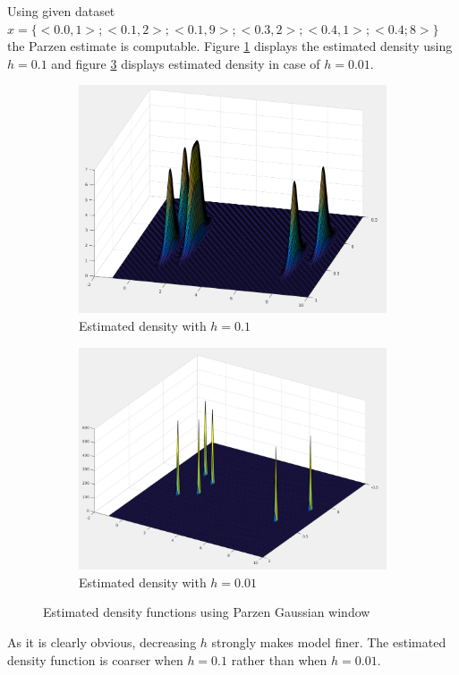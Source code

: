 \documentclass[12pt]{article}
\begin{document}
Using given dataset $x = \{<0.0, 1>; <0.1, 2>; <0.1, 9>; <0.3, 2>; <0.4, 1>; <0.4; 8>\}$ the Parzen estimate is computable. Figure \ref{fig:2-1} displays the estimated density using $h = 0.1$ and figure \ref{fig:2-2} displays estimated density in case of $h = 0.01$. 
\begin{figure}[h]
\centering
\begin{subfigure}{1\textwidth}
\centering
\includegraphics[scale=0.4]{Imgs/2-1.png}
\caption{Estimated density with $h = 0.1$}
\label{fig:2-1}
\end{subfigure}
\begin{subfigure}{1\textwidth}
\centering
\includegraphics[scale=0.35]{Imgs/2-2.png}
\caption{Estimated density with $h = 0.01$}
\label{fig:2-2}
\end{subfigure}
\caption{Estimated density functions using Parzen Gaussian window}
\end{figure}

As it is clearly obvious, decreasing $h$ strongly makes model finer. The estimated density function is coarser when $h = 0.1$ rather than when $h = 0.01$.
\end{document}
